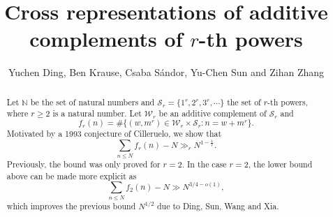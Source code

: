 \documentclass[12pt,a4paper,reqno]{amsart}
\numberwithin{equation}{section}
\theoremstyle{plain}
\theoremstyle{definition}
\begin{document}
\title
[Cross representations of additive complements of $r$-th powers]
{Cross representations of additive complements of $r$-th powers}

\author
[Y. Ding, B. Krause, C. S\'andor, Y. Sun and Z. Zhang] {Yuchen Ding, Ben Krause, Csaba S\'andor, Yu-Chen Sun and Zihan Zhang}

\address{(Yuchen Ding$^{1,2}$) $^1$School of Mathematics,  Yangzhou University, Yangzhou 225002, People's Republic of China}
\address{$^2$HUN-REN Alfr\'ed R\'enyi Institute of Mathematics, Budapest, Pf. 127, H-1364 Hungary}

\address{(Ben Krause) School of Mathematics, University of Bristol, Bristol, BS8 1UG, England}

\address{(Csaba S\'andor$^{3,4,5}$) $^3$Department of Stochastics, Institute of Mathematics, Budapest University of Technology and Economics, M\H ugyetem rkp. 3., H-1111,
Budapest, Hungary}
\address{$^4$HUN-REN Alfr\'ed R\'enyi Institute of Mathematics, Re\'altanoda utca 13--15., H-1053 Budapest, Hungary}
\address{$^5$MTA–HUN-REN RI Lend\"ulet ``Momentum'' Arithmetic Combinatorics Research Group, Reáltanoda utca 13--15., H-1053 Budapest, Hungary}

\address{(Yu-Chen Sun) School of Mathematics, University of Bristol, Bristol, BS8 1UG, England}

\address{(Zihan Zhang) School of Mathematical Sciences and LPMC, Nankai University, Tianjin
300071, People’s Republic of China}


\begin{abstract}
Let $\mathbb{N}$ be the set of natural numbers and $\mathcal{S}_r=\big\{1^r, 2^r, 3^r,\cdots\big\}$ the set of $r$-th powers, where $r\ge 2$ is a natural number. Let $\mathcal{W}_r$ be an additive complement of $\mathcal{S}_r$ and
$$
f_r(n)=\#\big\{(w,m^r)\in \mathcal{W}_r\times \mathcal{S}_r: n=w+m^r\big\}.
$$
Motivated by a 1993 conjecture of Cilleruelo, we show that 
$$
\sum_{n\le N}f_r(n)-N\gg_r N^{1-\frac{1}{r}}.
$$
Previously, the bound was only proved for $r=2$.
In the case $r=2$, the lower bound above can be made more explicit as 
$$
\sum_{n\le N}f_2(n)-N\gg N^{3/4-o(1)},
$$
which improves the previous bound $N^{1/2}$ due to Ding, Sun, Wang and Xia.
\end{abstract}
\maketitle
\end{document}
